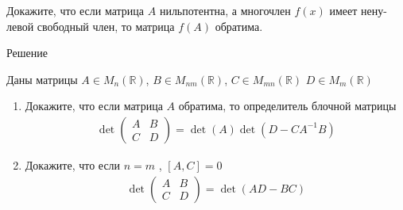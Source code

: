 \begin{prb}
Докажите, что если матрица $A$ нильпотентна, а многочлен $f(x)$ имеет нену-
левой свободный член, то матрица $f(A)$ обратима.
\end{prb}

\begin{sol}
    Решение
\end{sol}

\begin{prb}
Даны матрицы $A \in M_n(\mathbb{R})$, $B \in M_{nm}(\mathbb{R})$, $C \in M_{mn}(\mathbb{R})$ $D \in M_{m}(\mathbb{R})$ 
\begin{enumerate}
    \item Докажите, что если матрица $A$ обратима, то определитель блочной матрицы
    \begin{gather*}
    \det \left(
        \begin{array}{cc}
           A &  B \\
           C &  D
        \end{array}\right) = \det (A) \det (D -  C A^{-1} B)
    \end{gather*}
    
    \item  Докажите, что если $n = m$ , $\left[A,C\right] = 0$
        \begin{gather*}
            \det \left(
                \begin{array}{cc}
                   A &  B \\
                   C &  D
                \end{array}\right) 
                = \det (AD - BC)
        \end{gather*}
        
\end{enumerate}
\end{prb}


